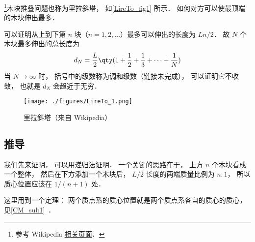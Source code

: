 
\begin{issues}
\issueDraft
\end{issues}


\footnote{参考 Wikipedia \href{https://en.wikipedia.org/wiki/Block-stacking_problem}{相关页面}．}木块推叠问题也称为里拉斜塔， 如\autoref{LireTo_fig1} 所示． 如何对方可以使最顶端的木块伸出最多．

可以证明从上到下第 $n$ 块（$n=1,2,\dots$）最多可以伸出的长度为 $Ln/2$． 故 $N$ 个木块最多伸出的总长度为
\begin{equation}
d_N = \frac{L}{2}\qty(1 + \frac{1}{2} + \frac{1}{3} + \dots + \frac{1}{N})
\end{equation}
当 $N\to\infty$ 时， 括号中的级数称为调和级数（链接未完成）， 可以证明它不收敛， 也就是 $d_N$ 会趋近于无穷．

\begin{figure}[ht]
\centering
\texttt{[image: ./figures/LireTo\_1.png]}
\caption{里拉斜塔（来自 Wikipedia）} \label{LireTo_fig1}
\end{figure}

\subsection{推导}
我们先来证明，   可以用递归法证明．  一个关键的思路在于， 上方 $n$ 个木块看成一个整体， 然后在下方添加一个木块后， $L/2$ 长度的两端质量比例为 $n:1$， 所以质心位置应该在 $1/(n+1)$ 处．

这里用到一个定理： 两个质点系的质心位置就是两个质点系各自的质心的质心， 见\autoref{CM_sub1}~．


